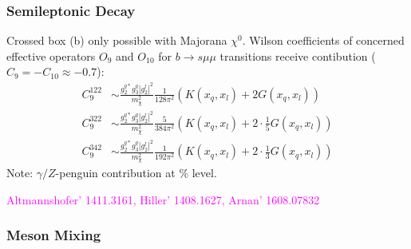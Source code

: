 \documentclass[hyperref={pdfpagelabels=false}]{beamer}
\begin{document}
 \begin{frame}
 \frametitle{Semileptonic Decay}
 \normalsize
Crossed box (b) only possible with Majorana $\chi^0$. Wilson coefficients of concerned effective operators $O_9$ and $O_{10}$ for $b\rightarrow s\mu\mu$
 transitions receive contibution ($C_9 = -C_{10} \approx -0.7$):
 \small
 \begin{align*}
   C_9^{122} &\sim  \frac{g_2^{q*}g_3^q|g_2^l|^2}{m_\chi^2} \frac{1}{128\pi^2} \left(K(x_q,x_l) + 2G(x_q,x_l)\right)\label{eq_WilsonBsmumu122}\\
 C_9^{{322}} &\sim  \frac{g_2^{q*}g_3^q|g_2^l|^2}{m_\chi^2} \frac{5}{384\pi^2} \left(K(x_q,x_l) + 2\cdot\frac15 G(x_q,x_l)\right)\\
 C_9^{{342}} &\sim  \frac{g_2^{q*}g_3^q|g_2^l|^2}{m_\chi^2} \frac{1}{192\pi^2} \left(K(x_q,x_l) + 2\cdot\frac13 G(x_q,x_l)\right)
 \end{align*}
 \normalsize
Note: $\gamma/Z$-penguin contribution at \% level.
 
         \begin{flushright}
  \textcolor{magenta}{\tiny{Altmannshofer' 1411.3161, Hiller' 1408.1627, Arnan' 1608.07832}}
 \end{flushright}
 \end{frame}

 \begin{frame}
  \frametitle{Meson Mixing}
    \begin{minipage}{0.6\textwidth}

  \end{minipage}
 \end{frame}
\end{document}
